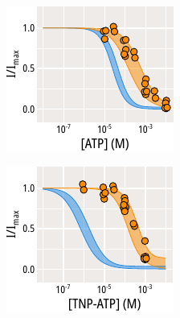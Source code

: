 \begin{figure}[h]
	\centering
	\begin{subfigure}[t]{0.45\textwidth}
		\caption{}\label{ch6fig:nosur_atp}
		\centering
		\includegraphics[width=\textwidth]{nosur_atp.pdf}
	\end{subfigure}
	\hfill
	\begin{subfigure}[t]{0.45\textwidth}
		\caption{}\label{ch6fig:nosur_tnpatp}
		\centering
		\includegraphics[width=\textwidth]{nosur_tnpatp.pdf}

\end{subfigure}
\end{figure}
